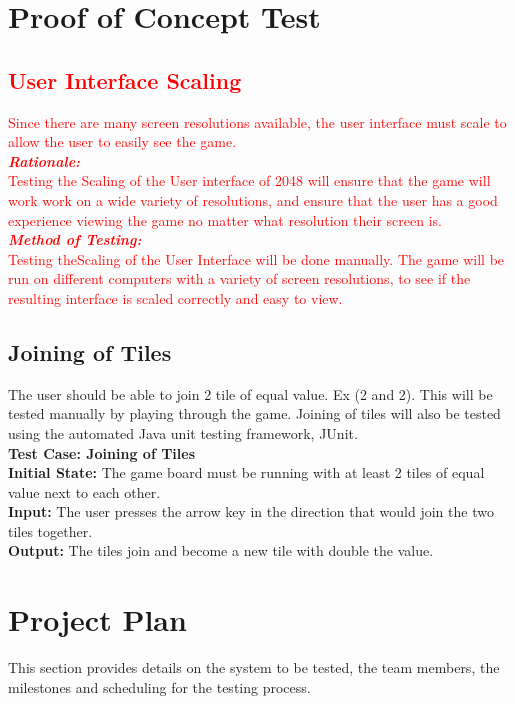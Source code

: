 \documentclass[12pt]{article}
\begin{document}
\section{Proof of Concept Test}

\subsection{\textcolor{red}{User Interface Scaling}}
\textcolor{red}{Since there are many screen resolutions available, the user interface must scale to allow the user to easily see the game. \\
\textbf{\emph{Rationale:}}\\
Testing the Scaling of the User interface of 2048 will ensure that the game will work work on a wide variety of resolutions, and ensure that the user has a good experience viewing the game no matter what resolution their screen is. \\
\textbf{\emph{Method of Testing:}}\\
Testing theScaling of the User Interface will be done manually. The game will be run on different computers with a variety of screen resolutions, to see if the resulting interface is scaled correctly and easy to view.}

\subsection{Joining of Tiles}
The user should be able to join 2 tile of equal value. Ex (2 and 2). This will be tested manually by playing through the game. Joining of tiles will also be tested using the automated Java unit testing framework, JUnit.\\

\textbf{Test Case: Joining of Tiles}\\
\textbf{Initial State:} The game board must be running with at least 2 tiles of equal value next to each other. \\
\textbf{Input:} The user presses the arrow key in the direction that would join the two tiles together. \\
\textbf{Output:} The tiles join and become a new tile with double the value.\\

\section{Project Plan}
This section provides details on the system to be tested, the team members, the milestones and scheduling for the testing process.
\end{document}
